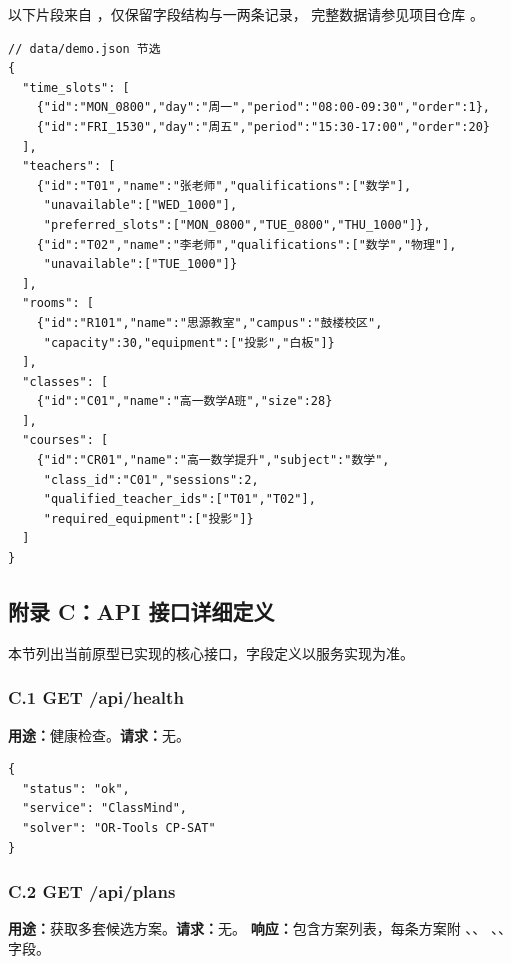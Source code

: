 以下片段来自 ，仅保留字段结构与一两条记录，
完整数据请参见项目仓库 。

\begin{lstlisting}[style=cmjson]
// data/demo.json 节选
{
  "time_slots": [
    {"id":"MON_0800","day":"周一","period":"08:00-09:30","order":1},
    {"id":"FRI_1530","day":"周五","period":"15:30-17:00","order":20}
  ],
  "teachers": [
    {"id":"T01","name":"张老师","qualifications":["数学"],
     "unavailable":["WED_1000"],
     "preferred_slots":["MON_0800","TUE_0800","THU_1000"]},
    {"id":"T02","name":"李老师","qualifications":["数学","物理"],
     "unavailable":["TUE_1000"]}
  ],
  "rooms": [
    {"id":"R101","name":"思源教室","campus":"鼓楼校区",
     "capacity":30,"equipment":["投影","白板"]}
  ],
  "classes": [
    {"id":"C01","name":"高一数学A班","size":28}
  ],
  "courses": [
    {"id":"CR01","name":"高一数学提升","subject":"数学",
     "class_id":"C01","sessions":2,
     "qualified_teacher_ids":["T01","T02"],
     "required_equipment":["投影"]}
  ]
}
\end{lstlisting}

\subsection*{附录 C：API 接口详细定义}

本节列出当前原型已实现的核心接口，字段定义以服务实现为准。

\subsubsection*{C.1 GET /api/health}

\textbf{用途：}健康检查。\textbf{请求：}无。

\begin{lstlisting}[style=cmjson]
{
  "status": "ok",
  "service": "ClassMind",
  "solver": "OR-Tools CP-SAT"
}
\end{lstlisting}

\subsubsection*{C.2 GET /api/plans}

\textbf{用途：}获取多套候选方案。\textbf{请求：}无。
\textbf{响应：}包含方案列表，每条方案附 、、
、、 字段。

